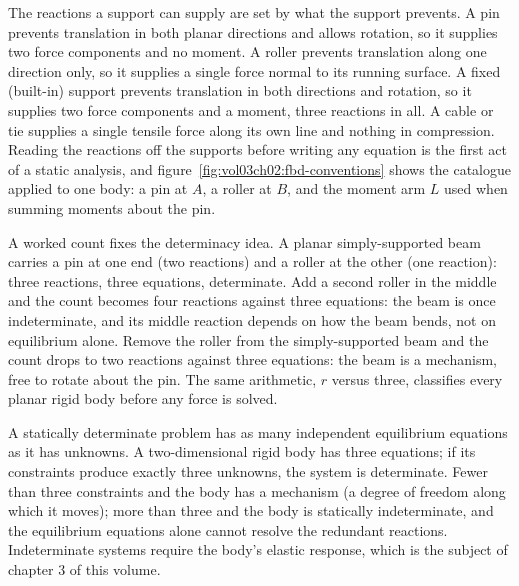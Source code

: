 

The reactions a support can supply are set by what the support
prevents. A pin prevents translation in both planar directions and
allows rotation, so it supplies two force components and no moment. A
roller prevents translation along one direction only, so it supplies a
single force normal to its running surface. A fixed (built-in) support
prevents translation in both directions and rotation, so it supplies
two force components and a moment, three reactions in all. A cable or
tie supplies a single tensile force along its own line and nothing in
compression. Reading the reactions off the supports before writing any
equation is the first act of a static analysis, and
figure~\ref{fig:vol03ch02:fbd-conventions} shows the catalogue applied
to one body: a pin at $A$, a roller at $B$, and the moment arm $L$ used
when summing moments about the pin.

A worked count fixes the determinacy idea. A planar simply-supported
beam carries a pin at one end (two reactions) and a roller at the other
(one reaction): three reactions, three equations, determinate. Add a
second roller in the middle and the count becomes four reactions
against three equations: the beam is once indeterminate, and its middle
reaction depends on how the beam bends, not on equilibrium alone.
Remove the roller from the simply-supported beam and the count drops to
two reactions against three equations: the beam is a mechanism, free to
rotate about the pin. The same arithmetic, $r$ versus three, classifies
every planar rigid body before any force is solved.

A statically determinate problem has as many independent equilibrium
equations as it has unknowns. A two-dimensional rigid body has three
equations; if its constraints produce exactly three unknowns, the
system is determinate. Fewer than three constraints and the body has
a mechanism (a degree of freedom along which it moves); more than
three and the body is statically indeterminate, and the equilibrium
equations alone cannot resolve the redundant reactions. Indeterminate
systems require the body's elastic response, which is the subject of
chapter 3 of this volume.

